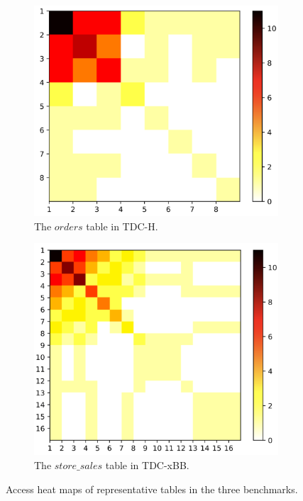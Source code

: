 \begin{figure}[]
    \begin{subfigure}[t]{0.5\textwidth}
        \centering
        \includegraphics[width=1\textwidth]{img/motivation/tpc-h-orders}
        \caption{The $orders$ table in TDC-H.}
        \label{fig:h_count_cdf}
    \end{subfigure}%

    \begin{subfigure}[t]{0.5\textwidth}
        \centering
        \includegraphics[width=1\textwidth]{img/motivation/tpc-bb-store_sales}
        \caption{The $store\_sales$ table in TDC-xBB.}
        \label{fig:bb_count_cdf}
    \end{subfigure}%
    \caption{Access heat maps of representative tables in the three benchmarks.}
    \label{fig:heatmap}
\end{figure}


